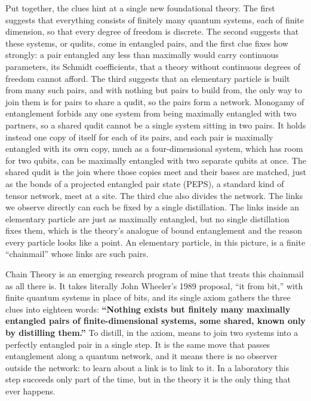 Put together, the clues hint at a single new foundational theory. The first suggests that everything consists of finitely many quantum systems, each of finite dimension, so that every degree of freedom is discrete. The second suggests that these systems, or qudits, come in entangled pairs, and the first clue fixes how strongly: a pair entangled any less than maximally would carry continuous parameters, its Schmidt coefficients, that a theory without continuous degrees of freedom cannot afford. The third suggests that an elementary particle is built from many such pairs, and with nothing but pairs to build from, the only way to join them is for pairs to share a qudit, so the pairs form a network. Monogamy of entanglement forbids any one system from being maximally entangled with two partners, so a shared qudit cannot be a single system sitting in two pairs. It holds instead one copy of itself for each of its pairs, and each pair is maximally entangled with its own copy, much as a four-dimensional system, which has room for two qubits, can be maximally entangled with two separate qubits at once. The shared qudit is the join where those copies meet and their bases are matched, just as the bonds of a projected entangled pair state (PEPS), a standard kind of tensor network, meet at a site. The third clue also divides the network. The links we observe directly can each be fixed by a single distillation. The links inside an elementary particle are just as maximally entangled, but no single distillation fixes them, which is the theory's analogue of bound entanglement and the reason every particle looks like a point. An elementary particle, in this picture, is a finite ``chainmail'' whose links are such pairs.

Chain Theory is an emerging research program of mine that treats this chainmail as all there is. It takes literally John Wheeler's 1989 proposal, ``it from bit,'' with finite quantum systems in place of bits, and its single axiom gathers the three clues into eighteen words: \textbf{``Nothing exists but finitely many maximally entangled pairs of finite-dimensional systems, some shared, known only by distilling them.''} To distill, in the axiom, means to join two systems into a perfectly entangled pair in a single step. It is the same move that passes entanglement along a quantum network, and it means there is no observer outside the network: to learn about a link is to link to it. In a laboratory this step succeeds only part of the time, but in the theory it is the only thing that ever happens.

